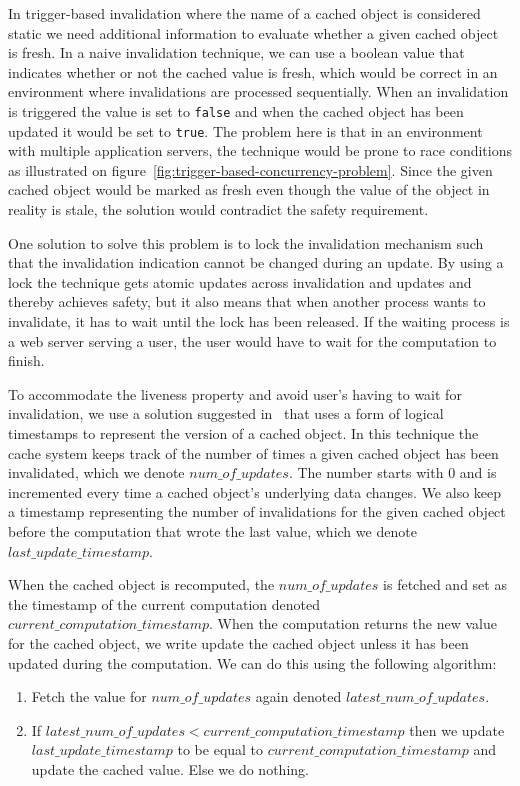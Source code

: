 In trigger-based invalidation where the name of a cached object is considered static we need additional information to evaluate whether a given cached object is fresh. In a naive invalidation technique, we can use a boolean value that indicates whether or not the cached value is fresh, which would be correct in an environment where invalidations are processed sequentially. When an invalidation is triggered the value is set to \verb$false$ and when the cached object has been updated it would be set to \verb$true$. The problem here is that in an environment with multiple application servers, the technique would be prone to race conditions as illustrated on figure~\ref{fig:trigger-based-concurrency-problem}. Since the given cached object would be marked as fresh even though the value of the object in reality is stale, the solution would contradict the safety requirement.

One solution to solve this problem is to lock the invalidation mechanism such that the invalidation indication cannot be changed during an update. By using a lock the technique gets atomic updates across invalidation and updates and thereby achieves safety, but it also means that when another process wants to invalidate, it has to wait until the lock has been released. If the waiting process is a web server serving a user, the user would have to wait for the computation to finish.

To accommodate the liveness property and avoid user's having to wait for invalidation, we use a solution suggested in~\cite{paper:ibm-extended} that uses a form of logical timestamps to represent the version of a cached object. In this technique the cache system keeps track of the number of times a given cached object has been invalidated, which we denote $num\_of\_updates$. The number starts with $0$ and is incremented every time a cached object's underlying data changes.
We also keep a timestamp representing the number of invalidations for the given cached object before the computation that wrote the last value, which we denote $last\_update\_timestamp$.

When the cached object is recomputed, the $num\_of\_updates$ is fetched and set as the timestamp of the current computation denoted $current\_computation\_timestamp$. When the computation returns the new value for the cached object, we write update the cached object unless it has been updated during the computation. We can do this using the following algorithm:

\begin{enumerate}
  \item Fetch the value for $num\_of\_updates$ again denoted $latest\_num\_of\_updates$.
  \item If $latest\_num\_of\_updates < current\_computation\_timestamp$ then we update $last\_update\_timestamp$ to be equal to $current\_computation\_timestamp$ and update the cached value. Else we do nothing.
\end{enumerate}

